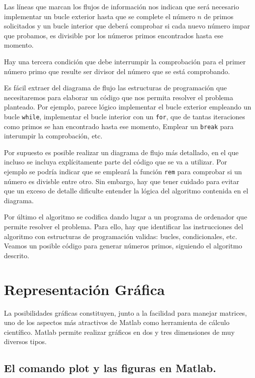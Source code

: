 Las líneas que marcan los flujos de información nos indican que será necesario implementar un bucle exterior hasta que se complete el número $n$ de primos solicitados y un bucle interior que deberá comprobar si cada nuevo número impar que probamos, es divisible por los números primos encontrados hasta ese momento.

Hay una tercera condición que debe interrumpir la comprobación para el primer número primo que resulte ser divisor del número que se está comprobando.

Es fácil extraer del diagrama de flujo las estructuras de programación que necesitaremos para elaborar un código que nos permita resolver el problema planteado. Por ejemplo, parece lógico implementar el bucle exterior empleando un bucle \texttt{while}, implementar el bucle interior con un \texttt{for}, que de tantas iteraciones como primos se han encontrado hasta ese momento, Emplear un \texttt{break} para interumpir la comprobación, etc.

Por supuesto es posible realizar un diagrama de flujo más detallado, en el que incluso se incluya explícitamente parte del código que se va a utilizar. Por ejemplo se podría indicar que se empleará la función \texttt{rem} para comprobar si un número es divisble entre otro. Sin embargo, hay que tener cuidado para evitar que un exceso de detalle dificulte entender la lógica del algoritmo contenida en el diagrama.

Por último el algoritmo se codifica dando lugar a un programa de ordenador que permite resolver el problema. Para ello, hay que identificar las instrucciones del algoritmo con estructuras de programación validas: bucles, condicionales, etc. Veamos un posible código para generar números primos, siguiendo el algoritmo descrito. 
 
% 
\section{Representación Gráfica}
La posibilidades gráficas constituyen, junto a la facilidad para manejar matrices, uno de los aspectos más atractivos de Matlab como herramienta de cálculo científico. Matlab permite realizar gráficos en dos y tres dimensiones de muy diversos tipos. 

\subsection{El comando plot y las figuras en Matlab.}
